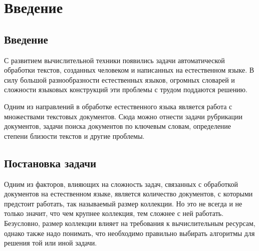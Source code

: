 \documentclass[12pt]{report}
\begin{document}

\textheight=23.0cm


\newpage

\onehalfspacing 


\tableofcontents
\thispagestyle{empty}





\newpage

\chapter*{Введение}


\section{Введение}

С развитием вычислительной техники появились задачи автоматической обработки текстов, созданных человеком и написанных на
естественном языке. В силу большой разнообразности естественных языков, огромных словарей и сложности языковых конструкций эти проблемы с трудом поддаются решению.

Одним из направлений в обработке естественного языка является работа с множествами текстовых документов. Сюда можно отнести задачи рубрикации документов, задачи поиска документов по ключевым словам, определение степени близости текстов и другие проблемы.

\section{Постановка задачи}

Одним из факторов, влияющих на сложность задач, связанных с обработкой документов на естественном языке, является количество документов, с которыми предстоит работать, так называемый размер коллекции. Но это не всегда и не только значит, что чем крупнее коллекция, тем сложнее с ней работать. Безусловно, размер коллекции влияет на требования к вычислительным ресурсам, однако также надо понимать, что необходимо правильно выбирать алгоритмы для решения той или иной задачи. 
\end{document}
